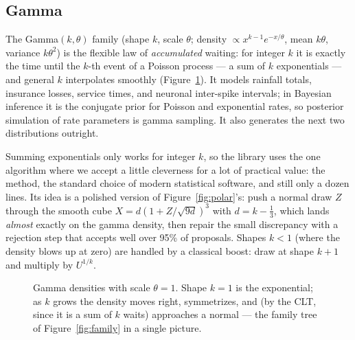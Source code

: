 \documentclass[11pt]{article}
\numberwithin{equation}{section}
\begin{document}
\subsection{Gamma}\label{sec:gamma}

The Gamma$(k,\theta)$ family (shape $k$, scale $\theta$; density
$\propto x^{k-1}e^{-x/\theta}$, mean $k\theta$, variance $k\theta^2$) is
the flexible law of \emph{accumulated} waiting: for integer $k$ it is
exactly the time until the $k$-th event of a Poisson process --- a sum of
$k$ exponentials --- and general $k$ interpolates smoothly
(Figure~\ref{fig:gamma}).  It models rainfall totals, insurance losses,
service times, and neuronal inter-spike intervals; in Bayesian inference
it is the conjugate prior for Poisson and exponential rates, so posterior
simulation of rate parameters is gamma sampling.  It also generates the
next two distributions outright.

Summing exponentials only works for integer $k$, so the library uses the
one algorithm where we accept a little cleverness for a lot of practical
value: the \citet{marsaglia2000gamma} method, the standard choice of
modern statistical software, and still only a dozen lines.  Its idea is a
polished version of Figure~\ref{fig:polar}'s: push a normal draw $Z$
through the smooth cube $X=d(1+Z/\sqrt{9d})^3$ with $d=k-\tfrac13$, which
lands \emph{almost} exactly on the gamma density, then repair the small
discrepancy with a rejection step that accepts well over 95\% of
proposals.  Shapes $k<1$ (where the density blows up at zero) are handled
by a classical boost: draw at shape $k+1$ and multiply by $U^{1/k}$.

\begin{figure}[htbp]
\centering
{}
\caption{Gamma densities with scale $\theta=1$.  Shape $k=1$ is the
exponential; as $k$ grows the density moves right, symmetrizes, and (by
the CLT, since it is a sum of $k$ waits) approaches a normal --- the
family tree of Figure~\ref{fig:family} in a single picture.}
\label{fig:gamma}
\end{figure}
\end{document}
